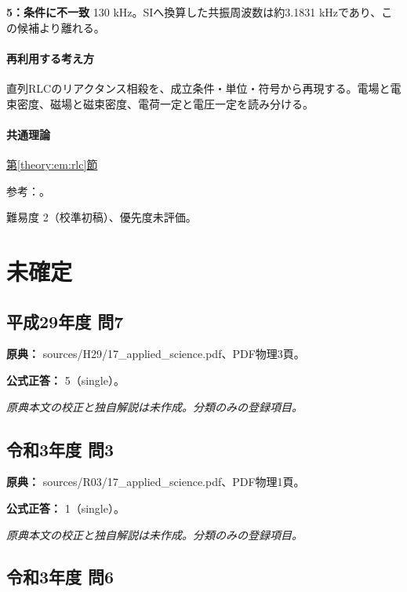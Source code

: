\noindent\textbf{5：条件に不一致} 130 kHz。SIへ換算した共振周波数は約3.1831 kHzであり、この候補より離れる。\par

\paragraph{再利用する考え方} 直列RLCのリアクタンス相殺を、成立条件・単位・符号から再現する。電場と電束密度、磁場と磁束密度、電荷一定と電圧一定を読み分ける。

\paragraph{共通理論} \hyperref[theory:em:rlc]{第\ref*{theory:em:rlc}節}

\par 参考：\cite{mit_em12}。

\par 難易度 2（校準初稿）、優先度未評価。

\section{未確定}

\subsection{平成29年度 問7}
\label{q:h29-reg-applied-07}

\noindent\textbf{原典：} sources/H29/17\_applied\_science.pdf、PDF物理3頁。

\textbf{公式正答：} 5（single）。

\par\textit{原典本文の校正と独自解説は未作成。分類のみの登録項目。}

\subsection{令和3年度 問3}
\label{q:r03-reg-applied-03}

\noindent\textbf{原典：} sources/R03/17\_applied\_science.pdf、PDF物理1頁。

\textbf{公式正答：} 1（single）。

\par\textit{原典本文の校正と独自解説は未作成。分類のみの登録項目。}

\subsection{令和3年度 問6}
\label{q:r03-reg-applied-06}


